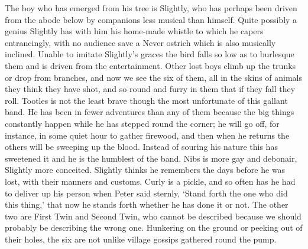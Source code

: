 \begin{Settings}
The boy who has emerged from his tree is Slightly,
who has perhaps been driven from the abode below by companions less musical than himself.
Quite possibly a genius Slightly has with him his home‐made whistle to which he capers entrancingly,
with no audience save a Never ostrich which is also musically inclined.
Unable to imitate Slightly’s graces the bird falls so low as to burlesque them
and is driven from the entertainment.
Other lost boys climb up the trunks or drop from branches,
and now we see the six of them, all in the skins of animals they think they have shot,
and so round and furry in them that if they fall they roll.
Tootles is not the least brave though the most unfortunate of this gallant band.
He has been in fewer adventures than any of them
because the big things constantly happen while he has stepped round the corner;
he will go off, for instance, in some quiet hour to gather firewood,
and then when he returns the others will be sweeping up the blood.
Instead of souring his nature this has sweetened it and he is the humblest of the band.
Nibs is more gay and debonair, Slightly more conceited.
Slightly thinks he remembers the days before he was lost, with their manners and customs.
Curly is a pickle, and so often has he had to deliver up his person when Peter said sternly,
‘Stand forth the one who did this thing,’ that now he stands forth whether he has done it or not.
The other two are First Twin and Second Twin,
who cannot be described because we should probably be describing the wrong one.
Hunkering on the ground or peeking out of their holes,
the six are not unlike village gossips gathered round the pump.
\end{Settings}

